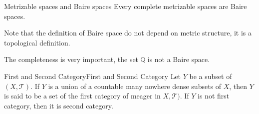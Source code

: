 \documentclass[../main.tex]{subfiles}
\begin{document}
\begin{corollary}{}{Metrizable spaces and Baire spaces }
Every complete metrizable spaces are Baire spaces.
\end{corollary}
\begin{remark}
Note that the definition of Baire space do not depend on metric structure, it is a topological definition.

The completeness is very important, the set $\mathbb{Q}$ is not a Baire space.
\end{remark}

\begin{definition}{First and Second Category}{First and Second Category}
Let $Y$ be a subset of $(X,\mathcal{T})$. If $Y$ is a union of a countable many nowhere dense subsets of $X$, then $Y$ is said to be a set of the first category of meager in  $X,\mathcal{T})$. If $Y$ is not first category, then it is second category.
\end{definition}
\end{document}
